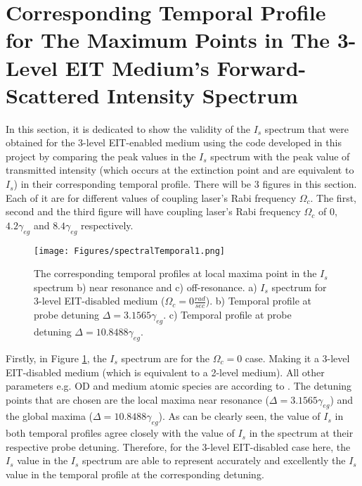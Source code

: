 \section{Corresponding Temporal Profile for The Maximum Points in The 3-Level EIT Medium's Forward-Scattered Intensity Spectrum}

In this section, it is dedicated to show the validity of the $I_{s}$ spectrum that were obtained for the 3-level EIT-enabled medium using the code developed in this project by comparing the peak values in the $I_{s}$ spectrum with the peak value of transmitted intensity (which occurs at the extinction point and are equivalent to $I_{s}$) in their corresponding temporal profile. There will be 3 figures in this section. Each of it are for different values of coupling laser's Rabi frequency $\Omega_{c}$. The first, second and the third figure will have coupling laser's Rabi frequency $\Omega_{c}$ of $0$, $4.2\gamma_{eg}$ and $8.4\gamma_{eg}$ respectively.

\begin{figure}[h!]
    \centering
    \texttt{[image: Figures/spectralTemporal1.png]}
    \caption{The corresponding temporal profiles at local maxima point in the $I_{s}$ spectrum b) near resonance and c) off-resonance. a) $I_{s}$ spectrum for 3-level EIT-disabled medium ($\Omega_{c} = 0 \frac{rad}{sec}$). b)  Temporal profile at probe detuning $\Delta = 3.1565\gamma_{eg}$. c) Temporal profile at probe detuning $\Delta = 10.8488\gamma_{eg}$.}
    \label{fig: corresponding temporal profile 1}
\end{figure}

Firstly, in Figure \ref{fig: corresponding temporal profile 1}, the $I_{s}$ spectrum are for the $\Omega_{c} = 0$ case. Making it a 3-level EIT-disabled medium (which is equivalent to a 2-level medium). All other parameters e.g. OD and medium atomic species are according to \cite{jeong2010slow}. The detuning points that are chosen are the local maxima near resonance ($\Delta = 3.1565\gamma_{eg}$) and the global maxima ($\Delta = 10.8488\gamma_{eg}$). As can be clearly seen, the value of $I_{s}$ in both temporal profiles agree closely with the value of $I_{s}$ in the spectrum at their respective probe detuning. Therefore, for the 3-level EIT-disabled case here, the $I_{s}$ value in the $I_{s}$ spectrum are able to represent accurately and excellently the $I_{s}$ value in the temporal profile at the corresponding detuning.\\

